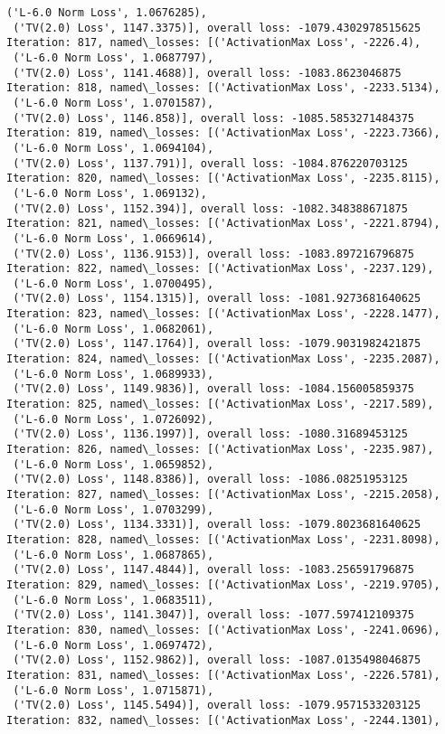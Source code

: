 \documentclass[10pt]{article}
\begin{document}
\begin{Verbatim}[commandchars=\\\{\}]
 ('L-6.0 Norm Loss', 1.0676285),
 ('TV(2.0) Loss', 1147.3375)], overall loss: -1079.4302978515625
Iteration: 817, named\_losses: [('ActivationMax Loss', -2226.4),
 ('L-6.0 Norm Loss', 1.0687797),
 ('TV(2.0) Loss', 1141.4688)], overall loss: -1083.8623046875
Iteration: 818, named\_losses: [('ActivationMax Loss', -2233.5134),
 ('L-6.0 Norm Loss', 1.0701587),
 ('TV(2.0) Loss', 1146.858)], overall loss: -1085.5853271484375
Iteration: 819, named\_losses: [('ActivationMax Loss', -2223.7366),
 ('L-6.0 Norm Loss', 1.0694104),
 ('TV(2.0) Loss', 1137.791)], overall loss: -1084.876220703125
Iteration: 820, named\_losses: [('ActivationMax Loss', -2235.8115),
 ('L-6.0 Norm Loss', 1.069132),
 ('TV(2.0) Loss', 1152.394)], overall loss: -1082.348388671875
Iteration: 821, named\_losses: [('ActivationMax Loss', -2221.8794),
 ('L-6.0 Norm Loss', 1.0669614),
 ('TV(2.0) Loss', 1136.9153)], overall loss: -1083.897216796875
Iteration: 822, named\_losses: [('ActivationMax Loss', -2237.129),
 ('L-6.0 Norm Loss', 1.0700495),
 ('TV(2.0) Loss', 1154.1315)], overall loss: -1081.9273681640625
Iteration: 823, named\_losses: [('ActivationMax Loss', -2228.1477),
 ('L-6.0 Norm Loss', 1.0682061),
 ('TV(2.0) Loss', 1147.1764)], overall loss: -1079.9031982421875
Iteration: 824, named\_losses: [('ActivationMax Loss', -2235.2087),
 ('L-6.0 Norm Loss', 1.0689933),
 ('TV(2.0) Loss', 1149.9836)], overall loss: -1084.156005859375
Iteration: 825, named\_losses: [('ActivationMax Loss', -2217.589),
 ('L-6.0 Norm Loss', 1.0726092),
 ('TV(2.0) Loss', 1136.1997)], overall loss: -1080.31689453125
Iteration: 826, named\_losses: [('ActivationMax Loss', -2235.987),
 ('L-6.0 Norm Loss', 1.0659852),
 ('TV(2.0) Loss', 1148.8386)], overall loss: -1086.08251953125
Iteration: 827, named\_losses: [('ActivationMax Loss', -2215.2058),
 ('L-6.0 Norm Loss', 1.0703299),
 ('TV(2.0) Loss', 1134.3331)], overall loss: -1079.8023681640625
Iteration: 828, named\_losses: [('ActivationMax Loss', -2231.8098),
 ('L-6.0 Norm Loss', 1.0687865),
 ('TV(2.0) Loss', 1147.4844)], overall loss: -1083.256591796875
Iteration: 829, named\_losses: [('ActivationMax Loss', -2219.9705),
 ('L-6.0 Norm Loss', 1.0683511),
 ('TV(2.0) Loss', 1141.3047)], overall loss: -1077.597412109375
Iteration: 830, named\_losses: [('ActivationMax Loss', -2241.0696),
 ('L-6.0 Norm Loss', 1.0697472),
 ('TV(2.0) Loss', 1152.9862)], overall loss: -1087.0135498046875
Iteration: 831, named\_losses: [('ActivationMax Loss', -2226.5781),
 ('L-6.0 Norm Loss', 1.0715871),
 ('TV(2.0) Loss', 1145.5494)], overall loss: -1079.9571533203125
Iteration: 832, named\_losses: [('ActivationMax Loss', -2244.1301),

\end{Verbatim}
\end{document}
